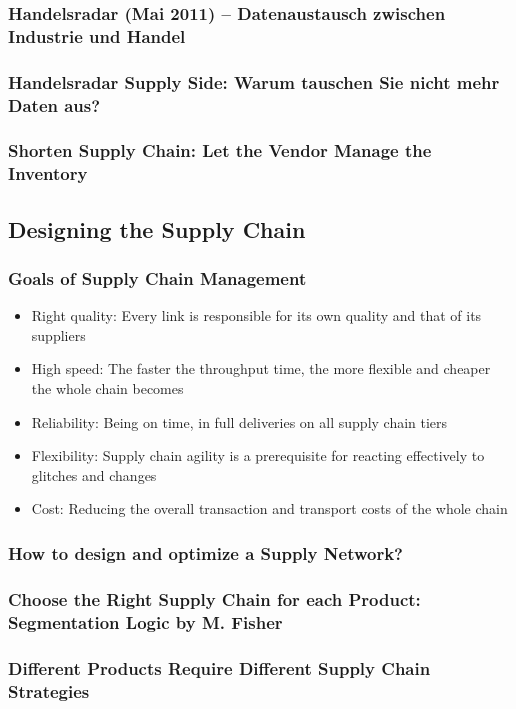 \subsubsection{Handelsradar (Mai 2011) – Datenaustausch zwischen Industrie und Handel}
\subsubsection{Handelsradar Supply Side: Warum tauschen Sie nicht mehr	Daten aus?}
\subsubsection{Shorten Supply Chain: Let the Vendor Manage the Inventory}
\subsection{Designing the Supply Chain}
\subsubsection{Goals of Supply Chain Management}
\begin{itemize}
	\item Right quality: Every link is responsible for its own quality and that of its suppliers 
	\item High speed: The faster the throughput time, the more flexible	and cheaper the whole chain becomes 
	\item Reliability: Being on time, in full deliveries on all supply chain tiers 
	\item Flexibility: Supply chain agility is a prerequisite for reacting effectively to glitches and changes
	\item Cost: Reducing the overall transaction and transport costs of the whole chain
\end{itemize}
\subsubsection{How to design and optimize a Supply Network?}
\subsubsection{Choose the Right Supply Chain for each Product: Segmentation Logic by M. Fisher}
\subsubsection{Different Products Require Different Supply Chain Strategies}
